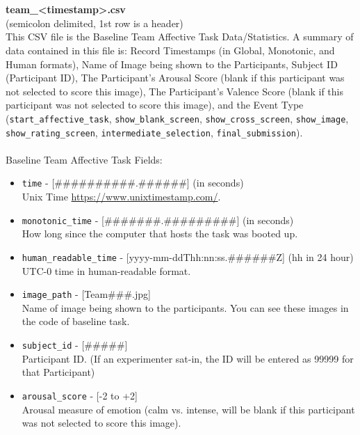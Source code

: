 \begin{description}
\begin{addmargin}[0em]{0em}
        \textbf{\\\\}
        \begin{addmargin}[1em]{0em} %
            \textbf{team\_<timestamp>.csv}\\(semicolon delimited, 1st row is a header)\\
            This CSV file is the Baseline Team Affective Task Data/Statistics. A summary of data contained in this file is: Record Timestamps (in Global, Monotonic, and Human formats), Name of Image being shown to the Participants, Subject ID (Participant ID), The Participant's Arousal Score (blank if this participant was not selected to score this image), The Participant's Valence Score (blank if this participant was not selected to score this image), and the Event Type
            (\verb|start_affective_task|, \verb|show_blank_screen|,
            \verb|show_cross_screen|, \verb|show_image|, \verb|show_rating_screen|,
            \verb|intermediate_selection|, \verb|final_submission|).\\\\
            Baseline Team Affective Task Fields:
            \begin{itemize}
                \item \verb|time| - [\#\#\#\#\#\#\#\#\#\#.\#\#\#\#\#\#] (in seconds)\\Unix Time \href{https://www.unixtimestamp.com/}{https://www.unixtimestamp.com/}.
                \item \verb|monotonic_time| - [\#\#\#\#\#\#\#.\#\#\#\#\#\#\#\#\#] (in seconds)\\How long since the computer that hosts the task was booted up.
                \item \verb|human_readable_time| - [yyyy-mm-ddThh:nn:ss.\#\#\#\#\#\#Z] (hh in 24 hour)\\ UTC-0 time in human-readable format.
                \item \verb|image_path| - [Team\#\#\#.jpg]\\Name of image being shown to the participants. You can see these images in the code of baseline task.
                \item \verb|subject_id| - [\#\#\#\#\#]\\Participant ID. (If an experimenter sat-in, the ID will be entered as 99999 for that Participant)
                \item \verb|arousal_score| - [-2 to +2]\\Arousal measure of emotion (calm vs. intense, will be blank if this participant was not selected to score this image).

\end{itemize}
\end{addmargin}
\end{addmargin}
\end{description}
